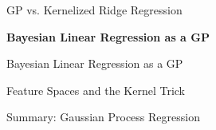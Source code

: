 
\begin{frame}[c]{GP vs. Kernelized Ridge Regression}



\end{frame}


\begin{frame}[c]{}
\centering
\huge
\textbf{Bayesian Linear Regression as a GP}
\end{frame}


\begin{frame}[c]{Bayesian Linear Regression as a GP}



\end{frame}


\begin{frame}[c,allowframebreaks]{Feature Spaces and the Kernel Trick}


\framebreak



\end{frame}


\begin{frame}[c]{Summary: Gaussian Process Regression}


\end{frame}



